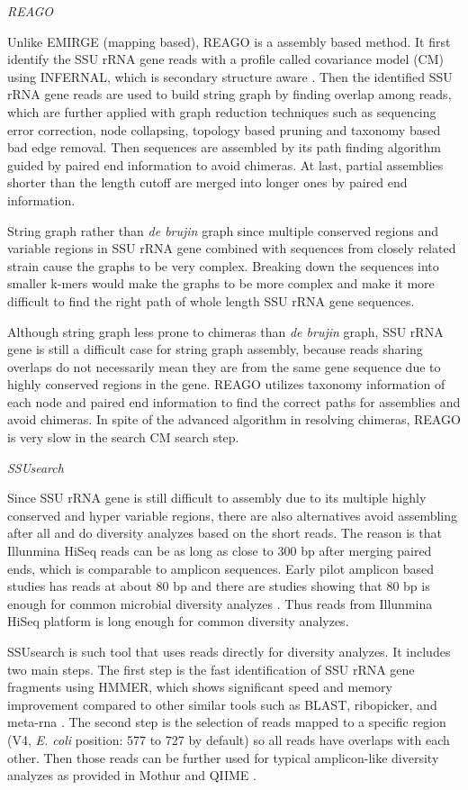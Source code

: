 \documentclass[]{msu-thesis}
\begin{document}
\textit{REAGO}

Unlike EMIRGE (mapping based), REAGO is a assembly based method. It
first identify the SSU rRNA gene reads with a profile called
covariance model (CM) using INFERNAL, which is secondary structure
aware \cite{nawrocki_infernal_2009}. Then the identified SSU rRNA gene
reads are used to build string graph by finding overlap among reads,
which are further applied with graph reduction techniques such as
sequencing error correction, node collapsing, topology based pruning
and taxonomy based bad edge removal. Then sequences are assembled by
its path finding algorithm guided by paired end information to avoid
chimeras. At last, partial assemblies shorter than the length cutoff
are merged into longer ones by paired end information.

String graph rather than \textit{de brujin} graph since multiple
conserved regions and variable regions in SSU rRNA gene combined with
sequences from closely related strain cause the graphs to be very
complex. Breaking down the sequences into smaller k-mers would make
the graphs to be more complex and make it more difficult to find the
right path of whole length SSU rRNA gene sequences.

Although string graph less prone to chimeras than \textit{de brujin}
graph, SSU rRNA gene is still a difficult case for string graph
assembly, because reads sharing overlaps do not necessarily mean they
are from the same gene sequence due to highly conserved regions in the
gene. REAGO utilizes taxonomy information of each node and paired end
information to find the correct paths for assemblies and avoid
chimeras. In spite of the advanced algorithm in resolving chimeras,
REAGO is very slow in the search CM search step.

\textit{SSUsearch}

Since SSU rRNA gene is still difficult to assembly due to its multiple
highly conserved and hyper variable regions, there are also
alternatives avoid assembling after all and do diversity analyzes
based on the short reads. The reason is that Illunmina HiSeq reads can
be as long as close to 300 bp after merging paired ends, which is
comparable to amplicon sequences. Early pilot amplicon based studies
has reads at about 80 bp and there are studies showing that 80 bp is
enough for common microbial diversity analyzes
\cite{sogin_microbial_2006}. Thus reads from Illunmina HiSeq platform
is long enough for common diversity analyzes.

SSUsearch is such tool that uses reads directly for diversity
analyzes. It includes two main steps. The first step is the fast
identification of SSU rRNA gene fragments using HMMER, which shows
significant speed and memory improvement compared to other similar
tools such as BLAST, ribopicker, and meta-rna
\cite{altschul_gapped_1997,schmieder_identification_2012,huang_identification_2009}. The
second step is the selection of reads mapped to a specific region (V4,
\textit{E. coli} position: 577 to 727 by default) so all reads have
overlaps with each other. Then those reads can be further used for
typical amplicon-like diversity analyzes as provided in Mothur and
QIIME \cite{schloss_introducing_2009,kuczynski_using_2012}.
\end{document}
